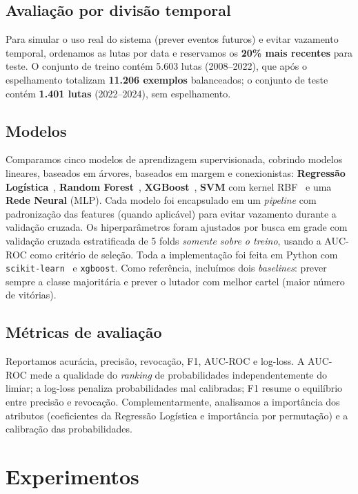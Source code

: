 \documentclass[10pt]{article}
\begin{document}
\subsection{Avaliação por divisão temporal}
Para simular o uso real do sistema (prever eventos futuros) e evitar vazamento
temporal, ordenamos as lutas por data e reservamos os \textbf{20\% mais
recentes} para teste. O conjunto de treino contém 5.603 lutas (2008--2022), que
após o espelhamento totalizam \textbf{11.206 exemplos} balanceados; o conjunto
de teste contém \textbf{1.401 lutas} (2022--2024), sem espelhamento.

\subsection{Modelos}
Comparamos cinco modelos de aprendizagem supervisionada, cobrindo modelos
lineares, baseados em árvores, baseados em margem e conexionistas:
\textbf{Regressão Logística}~\cite{hastie2009elements},
\textbf{Random Forest}~\cite{breiman2001random},
\textbf{XGBoost}~\cite{chen2016xgboost},
\textbf{SVM} com kernel RBF~\cite{cortes1995svm} e uma
\textbf{Rede Neural} (MLP). Cada modelo foi encapsulado em um \emph{pipeline}
com padronização das features (quando aplicável) para evitar vazamento durante a
validação cruzada. Os hiperparâmetros foram ajustados por busca em grade com
validação cruzada estratificada de 5 folds \emph{somente sobre o treino},
usando a AUC-ROC como critério de seleção. Toda a implementação foi feita em
Python com \texttt{scikit-learn}~\cite{scikit-learn} e \texttt{xgboost}.
Como referência, incluímos dois \emph{baselines}: prever sempre a classe
majoritária e prever o lutador com melhor cartel (maior número de vitórias).

\subsection{Métricas de avaliação}
Reportamos acurácia, precisão, revocação, F1, AUC-ROC e log-loss. A AUC-ROC
mede a qualidade do \emph{ranking} de probabilidades independentemente do
limiar; a log-loss penaliza probabilidades mal calibradas; F1 resume o
equilíbrio entre precisão e revocação. Complementarmente, analisamos a
importância dos atributos (coeficientes da Regressão Logística e importância por
permutação) e a calibração das probabilidades.

\section{Experimentos}
\end{document}
